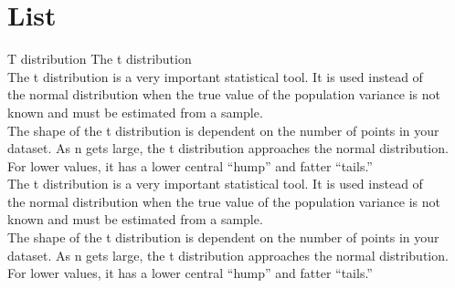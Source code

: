 \documentclass{purdue-slide}
\begin{document}
\section{List}

\begin{frame}{T distribution}
   \tiny The t distribution
\\The t distribution is a very important statistical tool. It is used instead of \\the normal distribution when the true value of the population variance is not \\known and must be estimated from a sample.
\\The shape of the t distribution is dependent on the number of points in your \\dataset. As n gets large, the t distribution approaches the normal distribution.
\\For lower values, it has a lower central “hump” and fatter “tails.”
\\The t distribution is a very important statistical tool. It is used instead of \\the normal distribution when the true value of the population variance is not \\known and must be estimated from a sample.
\\The shape of the t distribution is dependent on the number of points in your \\dataset. As n gets large, the t distribution approaches the normal distribution.
\\For lower values, it has a lower central “hump” and fatter “tails.”
    \begin{itemize}
       
    \end{itemize}
\end{frame}
\end{document}
